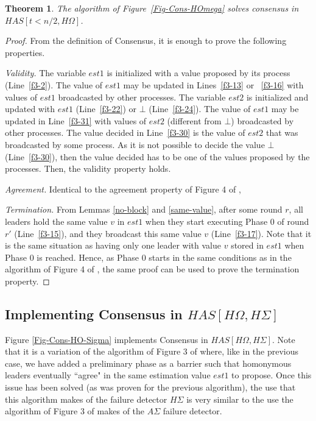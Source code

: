 \documentclass[10pt, conference, compsocconf]{IEEEtran}
\newtheorem{theorem}{Theorem}
\newcommand{\HO}{{H\Omega}}
\newcommand{\HS}{{H\Sigma}}
\newcommand{\AS}{{A\Sigma}}
\begin{document}
\begin{theorem}
\label{thm:consensus1}
The algorithm of Figure~\ref{Fig-Cons-HOmega} 
solves consensus in $\mathit{HAS}[t<n/2,\HO]$.
\end{theorem}
\begin{proof}
From the definition of Consensus, 
it is enough to prove the following properties.

\emph{Validity.} 
The variable  $est1$ is  initialized with a  value proposed by  its process
(Line~\ref{f3-2}). The value of  $est1$ may be updated in Lines~\ref{f3-13}
or ~\ref{f3-16} with  values of $est1$ broadcasted by  other processes. The
variable $est2$ is initialized  and updated with  $est1$ (Line~\ref{f3-22})
or  $\bot$  (Line~\ref{f3-24}). The  value  of  $est1$  may be  updated  in
Line~\ref{f3-31} with values of  $est2$ (different from $\bot$) broadcasted
by other processes.  The value decided in Line~\ref{f3-30}  is the value of
$est2$  that was  broadcasted by  some process.  As it  is not  possible to
decide the value  $\bot$ (Line~\ref{f3-30}), then the value  decided has to
be  one  of the  values  proposed by  the  processes.  Then,  the  validity
property holds.   

\emph{Agreement.} 
Identical to the agreement property of 
Figure 4 of \cite{DBLP:conf/aina/BonnetR10},

\emph{Termination.}
From Lemmas \ref{no-block} and  \ref{same-value}, after some round $r$, all
leaders  
hold the  same value  $v$ in $est1$  when they  start executing Phase  0 of
round  $r'$ (Line~\ref{f3-15}),  and  they broadcast  this  same value  $v$
(Line~\ref{f3-17}). Note that it is the same situation as having only  
one leader with value $v$ stored  in $est1$ when Phase 0 is reached. Hence,
as Phase 0 starts in the same conditions as in the algorithm of Figure 4 of
\cite{DBLP:conf/aina/BonnetR10}, the  same proof can  be used to  prove the
termination property. 
\end{proof}

\subsection{Implementing Consensus in $\mathit{HAS}[\HO,\HS]$}
Figure      \ref{Fig-Cons-HO-Sigma}       implements      Consensus      in
$\mathit{HAS}[\HO,\HS]$. Note  that it is  a variation of the  algorithm of
Figure  3 of  \cite{DBLP:conf/wdag/BonnetR10} where,  like in  the previous
case, we have  added a preliminary phase as a  barrier such that homonymous
leaders  eventually  ``agree"  in  the  same  estimation  value  $est1$  to
propose. Once  this issue has been  solved (as was proven  for the previous
algorithm), the use that this algorithm makes of the 
failure detector $\HS$ is very similar to the use the algorithm of Figure 3
of \cite{DBLP:conf/wdag/BonnetR10} makes of the $\AS$ failure detector.  
\end{document}
